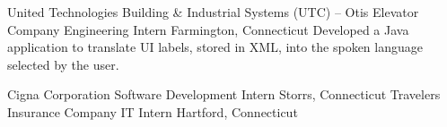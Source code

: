 		{United Technologies Building \& Industrial Systems (UTC) -- Otis Elevator Company}
		{Engineering Intern}
		{Farmington, Connecticut}{}
		{Developed a Java application to translate UI labels, stored in XML, into the spoken language selected by the user.}

		{Cigna Corporation}
		{Software Development Intern}
		{Storrs, Connecticut}{}
        {}
		{Travelers Insurance Company}
		{IT Intern}
		{Hartford, Connecticut}{}
        {}
